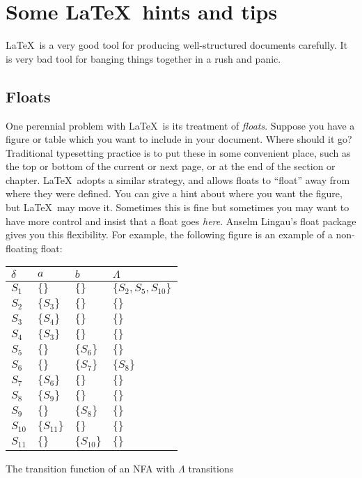 \chapter{Some \LaTeX\ hints and tips}\label{C:ex}
\LaTeX\ is a very good tool for producing well-structured documents 
carefully. It is very bad tool for banging things together in a rush 
and panic. 

\section{Floats}
One perennial problem with \LaTeX\ is its treatment of 
\emph{floats}.  Suppose you have a figure or table which you want to 
include in your document. Where should it go? Traditional typesetting 
practice is to put these in some convenient place, such as the top or 
bottom of the current or next page, or at the end of the section or 
chapter.  \LaTeX\ adopts a similar strategy, and allows floats to 
``float'' away from where they were defined. You can give a hint 
about where you want the figure, but \LaTeX\ may move it. Sometimes 
this is fine but sometimes you may want to have more control and 
insist that a float goes \emph{here}. Anselm Lingau's 
\textsf{float} package gives you this flexibility. For example, the following figure is an example of a non-floating float:

\begin{fig}[H]
\begin{center}
\begin{tabular}{l|lll}
$\delta$ & $\mathit{a}$ & $\mathit{b}$ & $\Lambda$ \\ \hline 
$S_{1}$  & $\{\}$       & $\{\}$      & $\{S_{2}, S_{5}, S_{10}\}$\\
$S_{2}$  & $\{S_{3}\}$  & $\{\}$      & $\{\}$\\
$S_{3}$  & $\{S_{4}\}$  & $\{\}$      & $\{\}$\\
$S_{4}$  & $\{S_{3}\}$  & $\{\}$      & $\{\}$\\
$S_{5}$  & $\{\}$       & $\{S_{6}\}$ & $\{\}$\\
$S_{6}$  & $\{\}$       & $\{S_{7}\}$ & $\{S_{8}\}$\\
$S_{7}$  & $\{S_{6}\}$  & $\{\}$      & $\{\}$\\
$S_{8}$  & $\{S_{9}\}$  & $\{\}$      & $\{\}$\\
$S_{9}$  & $\{\}$       & $\{S_{8}\}$ & $\{\}$\\
$S_{10}$ & $\{S_{11}\}$ & $\{\}$      & $\{\}$\\
$S_{11}$ & $\{\}$       & $\{S_{10}\}$& $\{\}$\\ 
\end{tabular}
\caption{The transition function of an NFA with $\Lambda$  transitions}

\end{center}
\end{fig}

